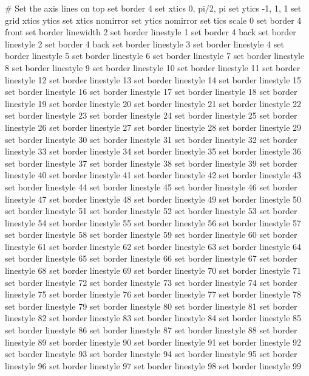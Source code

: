 # Set the axis lines on top
set border 4
set xtics 0, pi/2, pi
set ytics -1, 1, 1
set grid xtics ytics
set xtics nomirror
set ytics nomirror
set tics scale 0
set border 4 front
set border linewidth 2
set border linestyle 1
set border 4 back
set border linestyle 2
set border 4 back
set border linestyle 3
set border linestyle 4
set border linestyle 5
set border linestyle 6
set border linestyle 7
set border linestyle 8
set border linestyle 9
set border linestyle 10
set border linestyle 11
set border linestyle 12
set border linestyle 13
set border linestyle 14
set border linestyle 15
set border linestyle 16
set border linestyle 17
set border linestyle 18
set border linestyle 19
set border linestyle 20
set border linestyle 21
set border linestyle 22
set border linestyle 23
set border linestyle 24
set border linestyle 25
set border linestyle 26
set border linestyle 27
set border linestyle 28
set border linestyle 29
set border linestyle 30
set border linestyle 31
set border linestyle 32
set border linestyle 33
set border linestyle 34
set border linestyle 35
set border linestyle 36
set border linestyle 37
set border linestyle 38
set border linestyle 39
set border linestyle 40
set border linestyle 41
set border linestyle 42
set border linestyle 43
set border linestyle 44
set border linestyle 45
set border linestyle 46
set border linestyle 47
set border linestyle 48
set border linestyle 49
set border linestyle 50
set border linestyle 51
set border linestyle 52
set border linestyle 53
set border linestyle 54
set border linestyle 55
set border linestyle 56
set border linestyle 57
set border linestyle 58
set border linestyle 59
set border linestyle 60
set border linestyle 61
set border linestyle 62
set border linestyle 63
set border linestyle 64
set border linestyle 65
set border linestyle 66
set border linestyle 67
set border linestyle 68
set border linestyle 69
set border linestyle 70
set border linestyle 71
set border linestyle 72
set border linestyle 73
set border linestyle 74
set border linestyle 75
set border linestyle 76
set border linestyle 77
set border linestyle 78
set border linestyle 79
set border linestyle 80
set border linestyle 81
set border linestyle 82
set border linestyle 83
set border linestyle 84
set border linestyle 85
set border linestyle 86
set border linestyle 87
set border linestyle 88
set border linestyle 89
set border linestyle 90
set border linestyle 91
set border linestyle 92
set border linestyle 93
set border linestyle 94
set border linestyle 95
set border linestyle 96
set border linestyle 97
set border linestyle 98
set border linestyle 99
